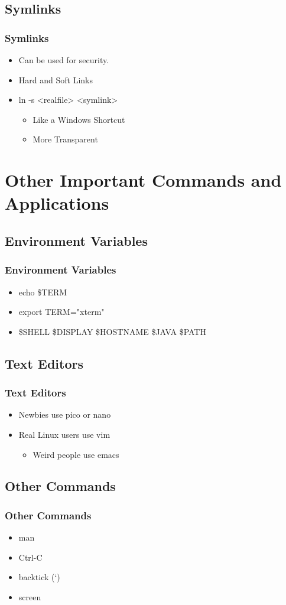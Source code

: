 \documentclass[hyperref={pdfpagelabels=false}]{beamer}
\begin{document}
\subsection{Symlinks}
\frame
{
    \frametitle{Symlinks}
    \begin{itemize}
    \item{Can be used for security.}
    \item{Hard and Soft Links}
    \item{ln -s <realfile> <symlink>}
        \begin{itemize}
        \item{Like a Windows Shortcut}
        \item{More Transparent}
        \end{itemize}
    \end{itemize}
}
\section{Other Important Commands and Applications}
\subsection{Environment Variables}
\frame
{
    \frametitle{Environment Variables}
    \begin{itemize}
    \item{echo \$TERM}
    \item{export TERM="xterm"}
    \item{\$SHELL \$DISPLAY \$HOSTNAME \$JAVA \$PATH}
    \end{itemize}
}
\subsection{Text Editors}
\frame
{	
    \frametitle{Text Editors}
    \begin{itemize}
    \item{Newbies use pico or nano}
    \item{Real Linux users use vim}
        \begin{itemize}
        \item{Weird people use emacs}
        \end{itemize}
    \end{itemize}
}
\subsection{Other Commands}
\frame
{
    \frametitle{Other Commands}
    \begin{itemize}
    \item{man}
    \item{Ctrl-C}
    \item{backtick (`)}
    \item{screen}
    \end{itemize}
}
\end{document}
